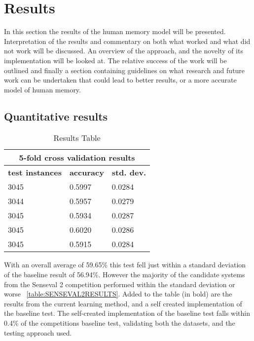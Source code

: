 \chapter{Results}

In this section the results of the human memory model will be presented.  Interpretation of the results and commentary on both what worked and what did not work will be discussed. An overview of the approach, and the novelty of its implementation will be looked at.  The relative success of the work will be outlined and finally a section containing guidelines on what research and future work can be undertaken that could lead to better results, or a more accurate model of human memory.

\section{Quantitative results}

\begin{table}[htp]
	\begin{center}
		\begin{tabular}{|l|l|l|}
			\hline
				\multicolumn{3}{|c|}{\bf 5-fold cross validation results } \\
				\hline
				{\bf test instances} & {\bf accuracy} & {\bf std. dev.} \\ \hline 
				3045 & 0.5997 & 0.0284    \\ \hline 
				3044 & 0.5957 & 0.0279 \\ \hline 
				3045 & 0.5934 & 0.0287 \\ \hline 
				3045 & 0.6020 & 0.0286 \\ \hline 
				3045 & 0.5915 & 0.0284 \\ \hline
		\end{tabular}
		\caption{Results Table}
	\end{center}
	\label{table:RESULTS}
\end{table}

With an overall average of 59.65\% this test fell just within a standard deviation of the baseline result of 56.94\%. However the majority of the candidate systems from the Senseval 2 competition performed within the standard deviation or worse ~\ref{table:SENSEVAL2RESULTS}. Added to the table (in bold) are the results from the current learning method, and a self created implementation of the baseline test.  The self-created implementation of the baseline test falls within 0.4\% of the competitions baseline test, validating both the datasets, and the testing approach used.

